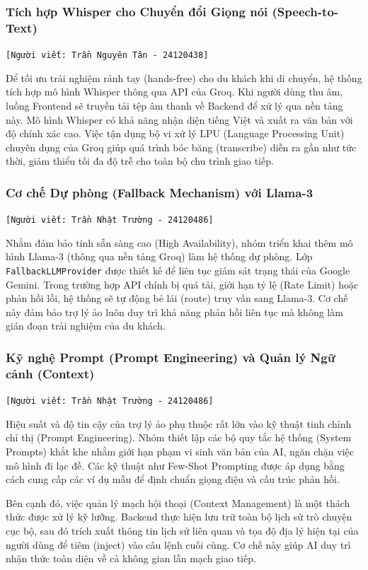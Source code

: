 \subsubsection{Tích hợp Whisper cho Chuyển đổi Giọng nói (Speech-to-Text)}
\texttt{[Người viết: Trần Nguyên Tân - 24120438]}

Để tối ưu trải nghiệm rảnh tay (hands-free) cho du khách khi di chuyển, hệ thống tích hợp mô hình Whisper thông qua API của Groq. Khi người dùng thu âm, luồng Frontend sẽ truyền tải tệp âm thanh về Backend để xử lý qua nền tảng này. Mô hình Whisper có khả năng nhận diện tiếng Việt và xuất ra văn bản với độ chính xác cao. Việc tận dụng bộ vi xử lý LPU (Language Processing Unit) chuyên dụng của Groq giúp quá trình bóc băng (transcribe) diễn ra gần như tức thời, giảm thiểu tối đa độ trễ cho toàn bộ chu trình giao tiếp.

\subsubsection{Cơ chế Dự phòng (Fallback Mechanism) với Llama-3}
\texttt{[Người viết: Trần Nhật Trường - 24120486]}

Nhằm đảm bảo tính sẵn sàng cao (High Availability), nhóm triển khai thêm mô hình Llama-3 (thông qua nền tảng Groq) làm hệ thống dự phòng. Lớp \texttt{FallbackLLMProvider} được thiết kế để liên tục giám sát trạng thái của Google Gemini. Trong trường hợp API chính bị quá tải, giới hạn tỷ lệ (Rate Limit) hoặc phản hồi lỗi, hệ thống sẽ tự động bẻ lái (route) truy vấn sang Llama-3. Cơ chế này đảm bảo trợ lý ảo luôn duy trì khả năng phản hồi liên tục mà không làm gián đoạn trải nghiệm của du khách.

\subsubsection{Kỹ nghệ Prompt (Prompt Engineering) và Quản lý Ngữ cảnh (Context)}
\texttt{[Người viết: Trần Nhật Trường - 24120486]}

Hiệu suất và độ tin cậy của trợ lý ảo phụ thuộc rất lớn vào kỹ thuật tinh chỉnh chỉ thị (Prompt Engineering). Nhóm thiết lập các bộ quy tắc hệ thống (System Prompts) khắt khe nhằm giới hạn phạm vi sinh văn bản của AI, ngăn chặn việc mô hình đi lạc đề. Các kỹ thuật như Few-Shot Prompting được áp dụng bằng cách cung cấp các ví dụ mẫu để định chuẩn giọng điệu và cấu trúc phản hồi.

Bên cạnh đó, việc quản lý mạch hội thoại (Context Management) là một thách thức được xử lý kỹ lưỡng. Backend thực hiện lưu trữ toàn bộ lịch sử trò chuyện cục bộ, sau đó trích xuất thông tin lịch sử liên quan và tọa độ địa lý hiện tại của người dùng để tiêm (inject) vào câu lệnh cuối cùng. Cơ chế này giúp AI duy trì nhận thức toàn diện về cả không gian lẫn mạch giao tiếp.

